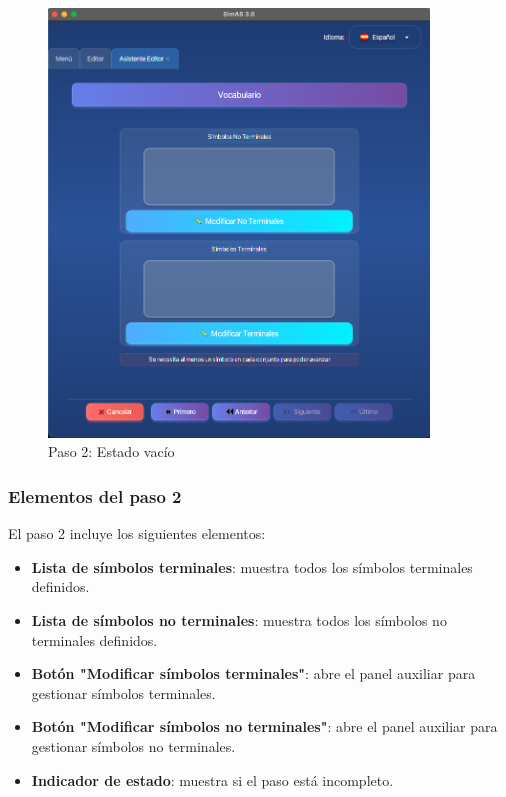 \needspace{8cm}
\begin{figure}[H]
    \centering
    \includegraphics[width=0.9\textwidth]{figuras/editor/paso2_simbolos_vacio.png}
    \caption{Paso 2: Estado vacío}
    \label{fig:paso2_vacio}
\end{figure}

\subsubsection{Elementos del paso 2}

El paso 2 incluye los siguientes elementos:

\begin{itemize}
    \item \textbf{Lista de símbolos terminales}: muestra todos los símbolos terminales definidos.
    \item \textbf{Lista de símbolos no terminales}: muestra todos los símbolos no terminales definidos.
    \item \textbf{Botón \string"Modificar símbolos terminales\string"}: abre el panel auxiliar para gestionar símbolos terminales.
    \item \textbf{Botón \string"Modificar símbolos no terminales\string"}: abre el panel auxiliar para gestionar símbolos no terminales.
    \item \textbf{Indicador de estado}: muestra si el paso está incompleto.
\end{itemize}

